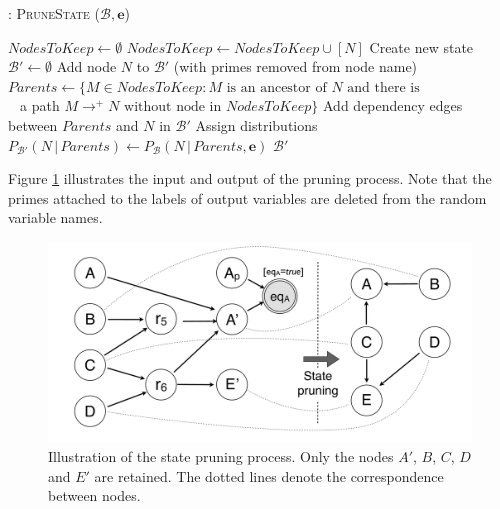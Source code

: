 \begin{algorithm}[h]
\caption{: \textsc{PruneState} ($\mathcal{B}, \mathbf{e}$)}
\begin{algorithmic}[1] \vspace{1mm}
\STATE $\mathit{NodesToKeep} \leftarrow \emptyset$
\STATE $\mathit{NodesToKeep} \leftarrow \mathit{NodesToKeep} \cup [N]$ 
\ENDIF
\ENDFOR
\STATE Create new state $\mathcal{B}' \leftarrow \emptyset$
\STATE Add node $N$ to $\mathcal{B}'$ (with primes removed from node name)
\STATE $\mathit{Parents} \leftarrow \{M \in \mathit{NodesToKeep} : M \text{ is an ancestor of } N \text{ and there is } $ \\ $\phantom{a}$  \; \; \; \; \; \; \; \; \;  a path $M \rightarrow^+  N \text{ without node in } \mathit{NodesToKeep} \}$ 
\STATE Add dependency edges between $\mathit{Parents}$ and $N$ in $\mathcal{B}'$
\STATE Assign distributions $P_{\mathcal{B}'}(N \, | \, \mathit{Parents}) \leftarrow P_{\mathcal{B}}(N \, | \, \mathit{Parents}, \mathbf{e})$
\ENDFOR
\RETURN $\mathcal{B}'$
\end{algorithmic}
\label{algo:pruneState}
\end{algorithm}


Figure \ref{fig:pruning} illustrates the input and output of the pruning process.  Note that the primes attached to the labels of output variables are deleted from the random variable names.

\begin{figure}[h]
\centering
\includegraphics[scale=0.25]{imgs/pruning.pdf}
\caption{Illustration of the state pruning process. Only the nodes $A'$, $B$, $C$, $D$ and $E'$ are retained. The dotted lines denote the correspondence between nodes.}
\label{fig:pruning}
\end{figure}


